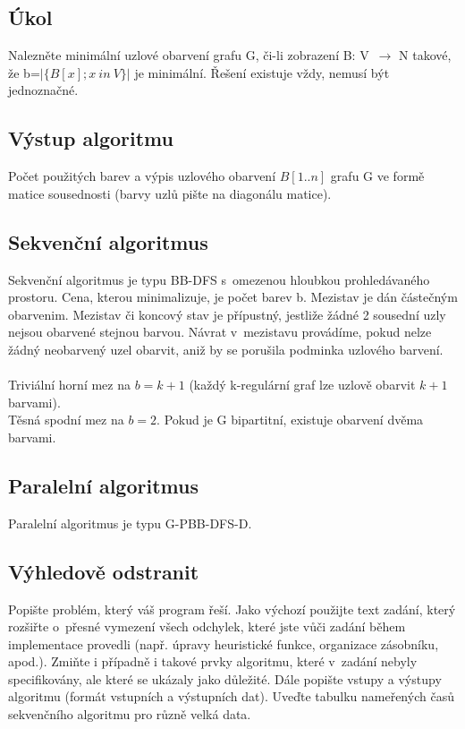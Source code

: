 \documentclass[12pt]{article}
\begin{document}
\subsection{Úkol} 

Nalezněte minimální uzlové obarvení grafu G, či-li zobrazení B: V~$\rightarrow$ N takové, že b=$\left|\{B[x]; x\ in\ V\}\right|$ je minimální. Řešení existuje vždy, nemusí být jednoznačné.

\subsection{Výstup algoritmu}

Počet použitých barev a výpis uzlového obarvení $B[1..n]$ grafu G ve formě matice sousednosti (barvy uzlů pište na diagonálu matice).\\

\subsection{Sekvenční algoritmus}

Sekvenční algoritmus je typu BB-DFS s~omezenou hloubkou prohledávaného prostoru. Cena, kterou minimalizuje, je počet barev b. Mezistav je dán částečným obarvenim. Mezistav či koncový stav je přípustný, jestliže žádné 2 sousední uzly nejsou obarvené stejnou barvou. Návrat v~mezistavu provádíme, pokud nelze žádný neobarvený uzel obarvit, aniž by se porušila podminka uzlového barvení.\\
\\
Triviální horní mez na $b=k+1$ (každý k-regulární graf lze uzlově obarvit $k+1$ barvami).\\
Těsná spodní mez na $b=2$. Pokud je G bipartitní, existuje obarvení dvěma barvami.


\subsection{Paralelní algoritmus}

Paralelní algoritmus je typu G-PBB-DFS-D. 

\subsection{Výhledově odstranit}
Popište problém, který váš program řeší. Jako výchozí použijte text
zadání, který rozšiřte o~přesné vymezení všech odchylek, které jste
vůči zadání během implementace provedli (např.  úpravy heuristické
funkce, organizace zásobníku, apod.). Zmiňte i případně i takové
prvky algoritmu, které v~zadání nebyly specifikovány, ale které se
ukázaly jako důležité.  Dále popište vstupy a výstupy algoritmu
(formát vstupních a výstupních dat). Uveďte tabulku nameřených časů
sekvenčního algoritmu pro různě velká data.
\end{document}
